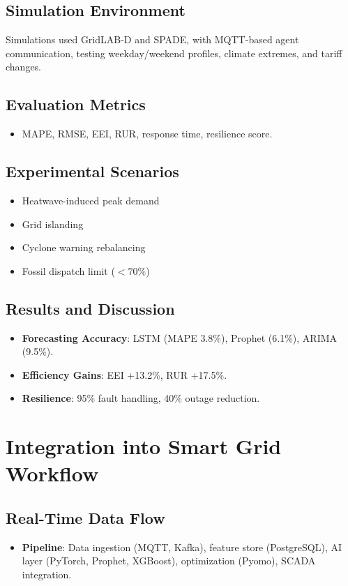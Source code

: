 \documentclass[12pt, a4paper, oneside]{book}
\begin{document}
\section{Simulation Environment}
Simulations used GridLAB-D and SPADE, with MQTT-based agent communication, testing weekday/weekend profiles, climate extremes, and tariff changes.

\section{Evaluation Metrics}
\begin{itemize}
    \item MAPE, RMSE, EEI, RUR, response time, resilience score.
\end{itemize}

\section{Experimental Scenarios}
\begin{itemize}
    \item Heatwave-induced peak demand
    \item Grid islanding
    \item Cyclone warning rebalancing
    \item Fossil dispatch limit ($<70\%$)
\end{itemize}

\section{Results and Discussion}
\begin{itemize}
    \item \textbf{Forecasting Accuracy}: LSTM (MAPE 3.8\%), Prophet (6.1\%), ARIMA (9.5\%).
    \item \textbf{Efficiency Gains}: EEI +13.2\%, RUR +17.5\%.
    \item \textbf{Resilience}: 95\% fault handling, 40\% outage reduction.
\end{itemize}

\chapter{Integration into Smart Grid Workflow}
\section{Real-Time Data Flow}
\begin{itemize}
    \item \textbf{Pipeline}: Data ingestion (MQTT, Kafka), feature store (PostgreSQL), AI layer (PyTorch, Prophet, XGBoost), optimization (Pyomo), SCADA integration.
\end{itemize}
\end{document}
